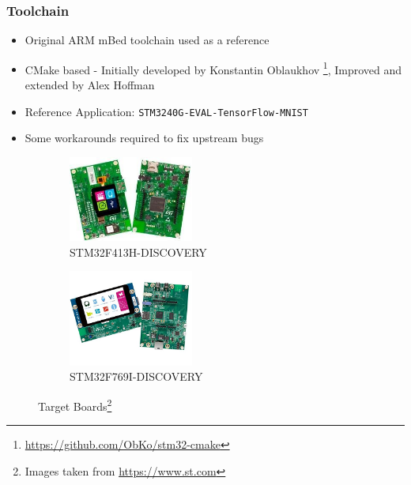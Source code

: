 \documentclass{tum-presentation}
\begin{document}
\begin{frame}
  \frametitle{Toolchain}

\begin{itemize}
    \item Original ARM mBed toolchain used as a reference
    \item CMake based - Initially developed by Konstantin Oblaukhov \footnote{\url{https://github.com/ObKo/stm32-cmake}}, Improved and extended by Alex Hoffman
    \item Reference Application: \lstinline{STM3240G-EVAL-TensorFlow-MNIST}
    \item Some workarounds required to fix upstream bugs
\end{itemize}

\begin{figure}[h]
     \centering
     \begin{subfigure}[b]{0.49\textwidth}
         \centering
         \includegraphics[width=0.45\textwidth]{figures/disco_f413h.jpg}
         \caption{STM32F413H-DISCOVERY}
         \label{fig:stm32f4}
     \end{subfigure}
     \hfill
     \begin{subfigure}[b]{0.49\textwidth}
         \centering
         \includegraphics[width=0.45\textwidth]{figures/disco_f769i.jpg}
         \caption{STM32F769I-DISCOVERY}
         \label{fig:stm32f7}
     \end{subfigure}
        \caption{Target Boards\footnote{Images taken from \url{https://www.st.com}}}
        \label{fig:boards}
\end{figure}

\end{frame}
\end{document}
